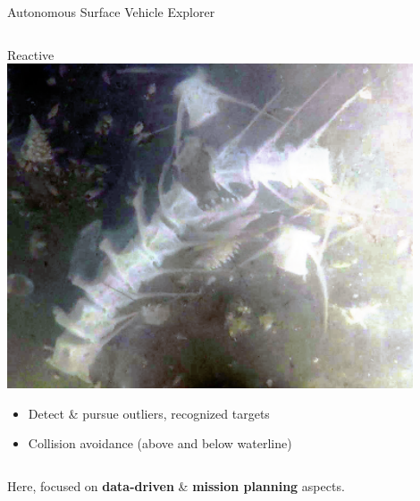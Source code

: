 \documentclass[9pt,xcolor=table]{beamer}
\begin{document}
\begin{frame}{Autonomous Surface Vehicle Explorer}
\begin{columns}
\begin{column}{0.33\textwidth}
\begin{block}{Reactive}
                \includegraphics[width=0.9\textwidth,trim={0cm 0cm 0cm 2cm},clip]{img/bones.png}
            \end{block}
            \begin{itemize}
                \item Detect \& pursue outliers, recognized targets
                \item Collision avoidance (above and below waterline)
            \end{itemize}
        \end{column}
    \end{columns}        
    \vspace{1cm}
    
    Here, focused on \textbf{data-driven} \& \textbf{mission planning} aspects.
\end{frame}
\end{document}
